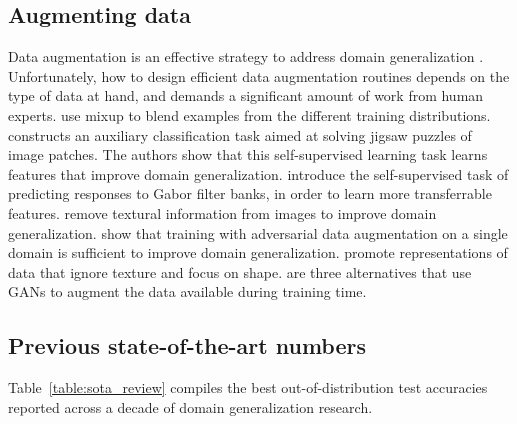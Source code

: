 \documentclass{article}
\begin{document}
\subsection{Augmenting data}

Data augmentation is an effective strategy to address domain generalization \citep{zhang2019unseen}. Unfortunately, how to design efficient data augmentation routines depends on the type of data at hand, and demands a significant amount of work from human experts.
\citet{xu2019adversarial, yan2020improve, wang2020h} use mixup \citep{zhang2017mixup} to blend examples from the different training distributions.
\citet{carlucci2019domain} constructs an auxiliary classification task aimed at solving jigsaw puzzles of image patches. The authors show that this self-supervised learning task learns features that improve domain generalization.
\citet{albuquerque2020i} introduce the self-supervised task of predicting responses to Gabor filter banks, in order to learn more transferrable features.
\citet{wang2019learning} remove textural information from images to improve domain generalization.
\citet{volpi2018generalizing} show that training with adversarial data augmentation on a single domain is sufficient to improve domain generalization.
\citet{nam2019reducing, asadi2019towards} promote representations of data that ignore texture and focus on shape.
\citet{rahman2019multi, zhou2020deep, carlucci2019domain} are three alternatives that use GANs to augment the data available during training time.


\subsection{Previous state-of-the-art numbers}
\label{app:sota_review}

Table~\ref{table:sota_review} compiles the best out-of-distribution test accuracies reported across a decade of domain generalization research.
\end{document}
